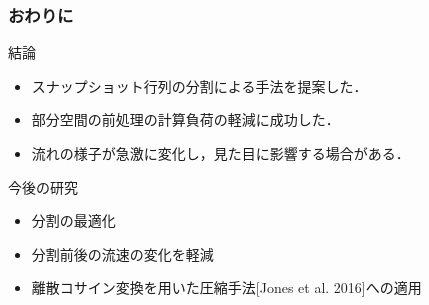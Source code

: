 \documentclass[aspectratio=169,dvipdfmx,hyperref={bookmarks=true}]{beamer}
\begin{document}
 \begin{frame}
 \frametitle{おわりに}
\begin{block}{結論}
\begin{itemize}
	\item スナップショット行列の分割による手法を提案した．
	\item 部分空間の前処理の計算負荷の軽減に成功した．
	\item 流れの様子が急激に変化し，見た目に影響する場合がある．
\end{itemize}
\end{block}
\begin{block}{今後の研究}
\begin{itemize}
	\item 分割の最適化
	\item 分割前後の流速の変化を軽減
	\item 離散コサイン変換を用いた圧縮手法[Jones et al. 2016]への適用
\end{itemize}
\end{block}
\end{frame}
    \appendix
\end{document}
